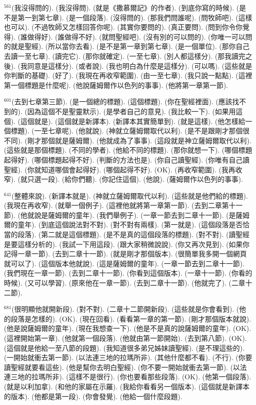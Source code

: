 \documentclass{book}
\begin{document}
$^{561}$(我沒得問的).
(我沒得問).
(就是《撒慕爾記》的作者).
(到底你寫的時候).
(是不是第一到第七章).
(是一個段落).
(沒得問的).
(那我們問誰呢).
(問牧師吧).
(這樣也可以).
(不過牧師又怎樣回答你呢).
(其實你要問的).
(真正要問).
(問到你令你覺得).
(誰做得好).
(誰做得不好).
(就問聖經吧).
(沒有別的可以問的).
(你唯一可以問的就是聖經).
(所以當你去看).
(是不是第一章到第七章).
(是一個單位).
(那你自己去讀一至七章).
(讀完它).
(那你就確定).
(一至七章).
(別人都這樣分).
(那我讀完之後).
(我同意是這樣分).
(或者說).
(我也明白為什麼是這樣分).
(可以嗎).
(這些就是你判斷的基礎).
(好了).
(我現在再收窄範圍).
(由一至七章).
(我只說一點點).
(這裡第一個標題是什麼呢).
(他說薩姆爾作以色列的事事).
(他將第一章第一節).

$^{601}$(去到七章第三節).
(是一個總的標題).
(這個標題).
(你在聖經裡面).
(應該找不到的).
(因為這個不是聖靈默示).
(是學者自己的意見).
(我比較一下).
(如果用這個).
(這個就是).
(這個就是新譯本).
(新譯本其實簡單到).
(就是這樣).
(他怎樣給一個標題).
(一至七章呢).
(他就說).
(神就立薩姆爾取代以利).
(是不是跟剛才那個很不同).
(剛才那個就是薩姆爾).
(他就成為了事事).
(這段就是神立薩姆爾取代以利).
(這些就是那個標題).
(不同的學者).
(他給不同的標題).
(那你就想一下).
(哪個標題起得好).
(哪個標題起得不好).
(判斷的方法也是).
(你自己讀聖經).
(你唯有自己讀聖經).
(你就知道哪個會起得好).
(哪個起得不好).
(OK).
(再收窄範圍).
(我再收窄).
(就只選一段).
(給你們聽).
(你記住這個).
(他說).
(薩姆爾作以色列的事事).

$^{641}$(整體來說).
(新譯本就是).
(神就立薩姆爾取代以利).
(這些就是他們給的標題).
(我現在再收窄).
(就舉一個例子).
(這裡他就將第一章第一節).
(去到二章第十一節).
(他就說是薩姆爾的童年).
(我們舉例子).
(一章一節去到二章十一節).
(是薩姆爾的童年).
(到底這個說法對不對).
(對不對有兩樣).
(第一就是).
(這個段落是否恰當的段落).
(第二就是這個標題).
(是不是真的這個段落的標題).
(對不對).
(讀聖經是要這樣分析的).
(我試一下用這段).
(跟大家稍微說說).
(你又再次見到).
(如果你記得一章一節).
(去到二章十一節).
(就是剛才那個版本).
(很簡單我多開一個網頁就可以了).
(這個版本他就說).
(這是薩姆爾的童年).
(一章一節去到二章十一節).
(我們現在一章一節).
(去到二章十一節).
(你看到這個版本).
(一章十一節).
(你看的時候).
(又可以學習).
(原來他在一章一節).
(去到二章十一節).
(他就完了).
(二章十二節).

$^{681}$(很明顯他就開新段).
(對不對).
(二章十二節開新段).
(這些就是你會看到).
(他的段落是怎樣的).
(OK).
(現在回看).
(看看第一章的第一節).
(剛才那個版本就說).
(他是說薩姆爾的童年).
(現在我想查一下).
(他是不是真的說薩姆爾的童年).
(OK).
(這裡開始第一章).
(他就第一個段落).
(他就由第一節開始).
(去到第八節).
(OK).
(這個就是他給一至八節的段題).
(我知道很多弟兄姊妹讀聖經).
(是不理這些的).
(一開始就衝去第一節).
(以法連三地的拉瑪所非).
(其他什麼都不看).
(不行).
(你要讀聖經就要看這些).
(他是幫你去明白聖經).
(你不要一開始就衝去第一節).
(以法連三地的拉瑪所非).
(這樣不是很行).
(你也要看那些段落).
(OK).
(他第一個段落).
(就是以利加拿).
(和他的家屬在示羅).
(我給你看看另一個版本).
(這個就是新譯本的版本).
(他都是第一段).
(你會發覺).
(他給一個什麼段題).
\end{document}
